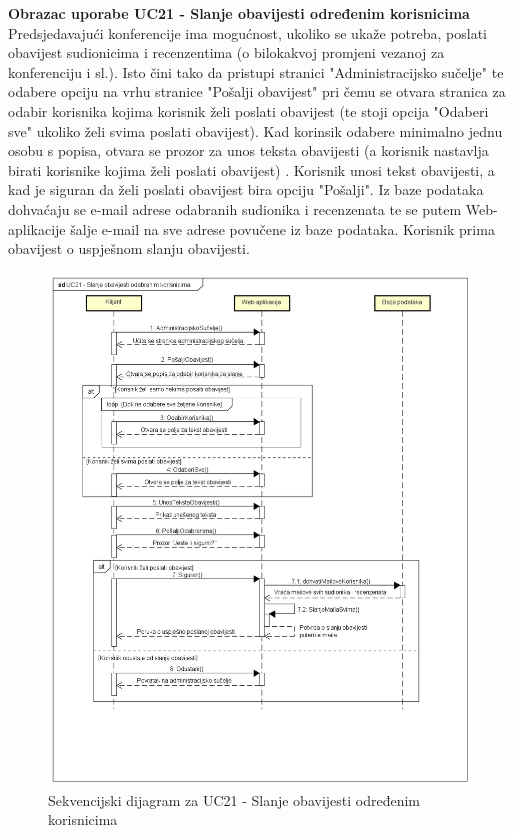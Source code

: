 				\eject


				\textbf{Obrazac uporabe UC21 - Slanje obavijesti određenim korisnicima}\\
				Predsjedavajući konferencije ima mogućnost, ukoliko se ukaže potreba, poslati obavijest sudionicima i recenzentima (o bilokakvoj promjeni vezanoj za konferenciju i sl.). Isto čini tako da pristupi stranici "Administracijsko sučelje" te odabere opciju na vrhu stranice "Pošalji obavijest" pri čemu se otvara stranica za odabir korisnika kojima korisnik želi poslati obavijest (te stoji opcija "Odaberi sve" ukoliko želi svima poslati obavijest). Kad korinsik odabere minimalno jednu osobu s popisa, otvara se prozor za unos teksta obavijesti (a korisnik nastavlja birati korisnike kojima želi poslati obavijest) . Korisnik unosi tekst obavijesti, a kad je siguran da želi poslati obavijest bira opciju "Pošalji". Iz baze podataka dohvaćaju se e-mail adrese odabranih sudionika i recenzenata te se putem Web-aplikacije šalje e-mail na sve adrese povučene iz baze podataka. Korisnik prima obavijest o uspješnom slanju obavijesti.
				\eject

				\begin{figure}[H]
					\includegraphics[scale=0.45]{dijagrami/UC21-SlanjeMaila.png} 
					\centering
					\caption{Sekvencijski dijagram za UC21 - Slanje obavijesti određenim korisnicima}
					\label{fig:sekvencijski3}
				\end{figure}

